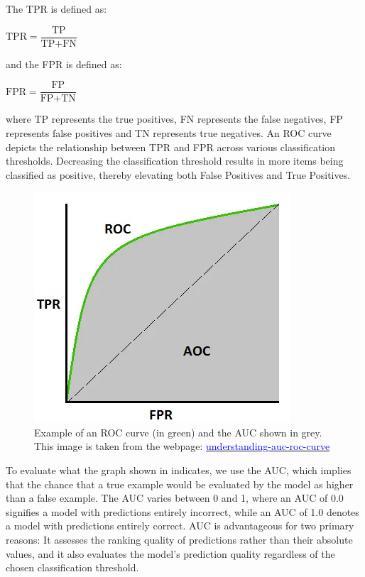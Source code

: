 \documentclass{l4proj}
\begin{document}
The TPR is defined as: 

\begin{center}
    $\text{TPR} = \dfrac{\text{TP}}{\text{TP} + \text{FN}}$ \\
\end{center}

and the FPR is defined as: 

\begin{center}
    $\text{FPR} = \dfrac{\text{FP}}{\text{FP} + \text{TN}}$
\end{center}

where TP represents the true positives, FN represents the false negatives, FP represents false positives and TN represents true negatives. An ROC curve depicts the relationship between TPR and FPR across various classification thresholds. Decreasing the classification threshold results in more items being classified as positive, thereby elevating both False Positives and True Positives. \\ 

\begin{figure}[h]
    \centering
    \includegraphics[width=0.5\linewidth]{images/roc_auc.png}
    \caption{Example of an ROC curve (in green) and the AUC shown in grey. This image is taken from the webpage: \href{https://towardsdatascience.com/understanding-auc-roc-curve-68b2303cc9c5}{\textcolor{blue}{understanding-auc-roc-curve}}}
    \label{fig:roc_auc}
\end{figure}

To evaluate what the graph shown in  indicates, we use the AUC, which implies that the chance that a true example would be evaluated by the model as higher than a false example. The AUC varies between 0 and 1, where an AUC of 0.0 signifies a model with predictions entirely incorrect, while an AUC of 1.0 denotes a model with predictions entirely correct. AUC is advantageous for two primary reasons: It assesses the ranking quality of predictions rather than their absolute values, and it also evaluates the model's prediction quality regardless of the chosen classification threshold. \\
\end{document}
